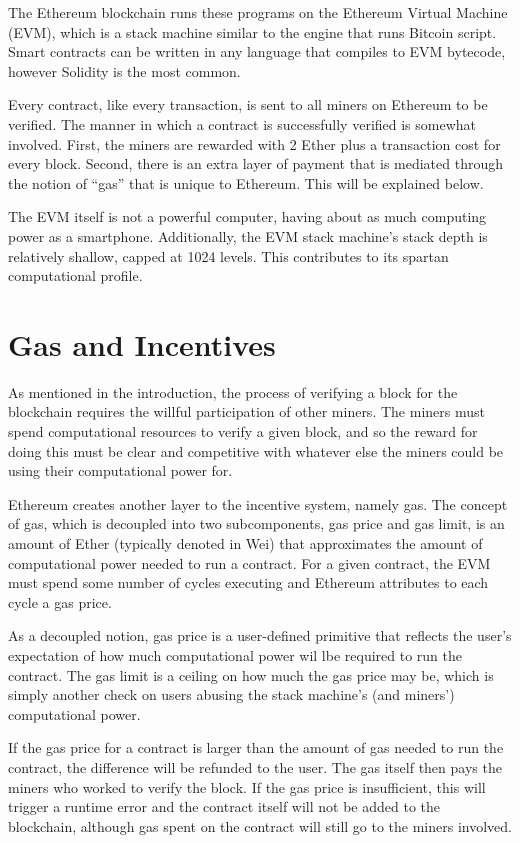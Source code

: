 \documentclass[twoside]{article}
\begin{document}
The Ethereum blockchain runs these programs on the Ethereum Virtual Machine
(EVM), which is a stack machine similar to the engine that runs Bitcoin script.
Smart contracts can be written in any language that compiles to EVM bytecode,
however Solidity is the most common.

Every contract, like every transaction, is sent to all miners on Ethereum to be
verified.  The manner in which a contract is successfully verified is somewhat
involved.  First, the miners are rewarded with 2 Ether plus a transaction cost
for every block.  Second, there is an extra layer of payment that is mediated
through the notion of ``gas'' that is unique to Ethereum.  This will be
explained below.  

The EVM itself is not a powerful computer, having about as much computing power
as a smartphone.  Additionally, the EVM stack machine's stack depth is
relatively shallow, capped at 1024 levels.  This contributes to its spartan
computational profile.

\section{Gas and Incentives}

As mentioned in the introduction, the process of verifying a block for the
blockchain requires the willful participation of other miners.  The miners must
spend computational resources to verify a given block, and so the reward for
doing this must be clear and competitive with whatever else the miners could be
using their computational power for. 

Ethereum creates another layer to the incentive system, namely gas.  The concept
of gas, which is decoupled into two subcomponents, gas price and gas limit, is
an amount of Ether (typically denoted in Wei) that approximates the amount of
computational power needed to run a contract.  For a given contract, the EVM
must spend some number of cycles executing and Ethereum attributes to each cycle a
gas price.

As a decoupled notion, gas price is a user-defined primitive that
reflects the user's expectation of how much computational power wil lbe required
to run the contract.  The gas limit is a ceiling on how much the gas price may
be, which is simply another check on users abusing the stack machine's (and
miners') computational power.

If the gas price for a contract is larger than the amount of gas needed to run
the contract, the difference will be refunded to the user.  The gas itself then
pays the miners who worked to verify the block.  If the gas price is
insufficient, this will trigger a runtime error and the contract itself will not
be added to the blockchain, although gas spent on the contract will still go to
the miners involved.
\end{document}

